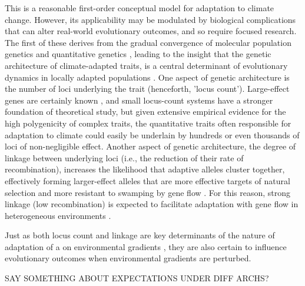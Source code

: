 \documentclass[9pt,twocolumn,twoside,lineno]{pnas-new}
\begin{document}
This is a reasonable first-order conceptual model
for adaptation to climate change.
However, its applicability may be modulated by biological complications
that can alter real-world evolutionary outcomes, and
so require focused research. 
The first of these derives from the gradual convergence of molecular population genetics
and quantitative genetics \cite{barghi_polygenic,barton,pritchard_human_adaptation,pritchard_sweeps_alone},
leading to the insight that the genetic architecture of
climate-adapted traits, is a central determinant
of evolutionary dynamics in locally adapted populations \cite{yeaman_review}. 
One aspect of genetic architecture is the number of loci 
underlying the trait (henceforth, 'locus count'). 
Large-effect genes are certainly known \cite{martin,rees},
and small locus-count systems have a stronger foundation
of theoretical study,
but given extensive empirical evidence for the high polygenicity \cite{boyle,rockman,savolainen,sella}
of complex traits, the
quantitative traits often responsible for adaptation to climate could easily be 
underlain by hundreds or even thousands of loci of non-negligible effect.
Another aspect of genetic architecture, the degree of linkage between underlying loci
(i.e., the reduction of their rate of recombination),
increases the likelihood that adaptive alleles cluster together,
effectively forming larger-effect alleles that are more 
effective targets of natural selection and more resistant
to swamping by gene flow \cite{yeaman_whitlock}.
For this reason, strong linkage (low recombination)
is expected to facilitate
adaptation with gene flow in heterogeneous environments \cite{tigano}.

Just as both locus count and linkage
are key determinants of the nature of adaptation of a 
on environmental gradients \cite{barton,yeaman_whitlock,yeaman_review},
they are also certain to influence evolutionary
outcomes when environmental gradients are perturbed.

SAY SOMETHING ABOUT EXPECTATIONS UNDER DIFF ARCHS?
\end{document}
